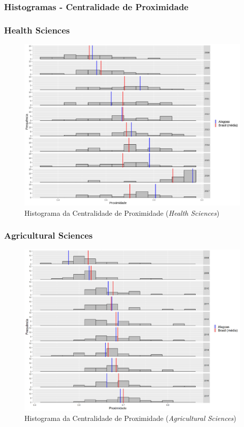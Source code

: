 \subsubsection{Histogramas - Centralidade de Proximidade}

\subsubsection{Health Sciences}

\begin{figure}[H]
	\centering
	\includegraphics[scale=0.6]{Imagens/closeness-hist.pdf}
	\caption{Histograma da Centralidade de Proximidade (\textit{Health Sciences})}
	\label{hist-health-close}
\end{figure}

\subsubsection{Agricultural Sciences}

\begin{figure}[H]
	\centering
	\includegraphics[scale=0.6]{Imagens/agricultural/closeness-hist.pdf}
	\caption{Histograma da Centralidade de Proximidade (\textit{Agricultural Sciences})}
	\label{hist-agri-close}
\end{figure}

